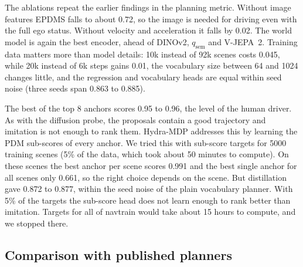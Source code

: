 The ablations repeat the earlier findings in the planning metric. Without image
features EPDMS falls to about 0.72, so the image is needed for driving even with
the full ego status. Without velocity and acceleration it falls by 0.02. The world
model is again the best encoder, ahead of DINOv2, $q_{\text{sem}}$ and V-JEPA~2.
Training data matters more than model details: 10k instead of 92k scenes costs
0.045, while 20k instead of 6k steps gains 0.01, the vocabulary size between 64 and
1024 changes little, and the regression and vocabulary heads are equal within
seed noise (three seeds span 0.863 to 0.885).

The best of the top 8 anchors scores 0.95 to 0.96, the level of the human driver.
As with the diffusion probe, the proposals contain a good trajectory and imitation
is not enough to rank them. Hydra-MDP addresses this by learning the PDM
sub-scores of every anchor. We tried this with sub-score targets for 5000 training
scenes (5\% of the data, which took about 50 minutes to compute). On these scenes
the best anchor per scene scores 0.991 and the best single anchor for all scenes
only 0.661, so the right choice depends on the scene. But distillation gave
0.872 to 0.877, within the seed noise of the plain vocabulary planner. With 5\% of
the targets the sub-score head does not learn enough to rank better than
imitation. Targets for all of navtrain would take about 15 hours to compute, and
we stopped there.

\subsection{Comparison with published planners}
\label{sec:published}

